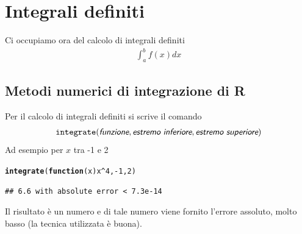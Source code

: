 \documentclass[onecolumn,11pt]{book}\usepackage[]{graphicx}\usepackage[]{color}
\makeatletter
\newcommand{\hlnum}[1]{\textcolor[rgb]{0.686,0.059,0.569}{#1}}%
\newcommand{\hlopt}[1]{\textcolor[rgb]{0,0,0}{#1}}%
\newcommand{\hlstd}[1]{\textcolor[rgb]{0.345,0.345,0.345}{#1}}%
\newcommand{\hlkwa}[1]{\textcolor[rgb]{0.161,0.373,0.58}{\textbf{#1}}}%
\newcommand{\hlkwc}[1]{\textcolor[rgb]{0.333,0.667,0.333}{#1}}%
\newcommand{\hlkwd}[1]{\textcolor[rgb]{0.737,0.353,0.396}{\textbf{#1}}}%
\newenvironment{kframe}{%
 \def\at@end@of@kframe{}%
 \ifinner\ifhmode%
  \def\at@end@of@kframe{\end{minipage}}%
  \begin{minipage}{\columnwidth}%
 \fi\fi%
 \def\FrameCommand##1{\hskip\@totalleftmargin \hskip-\fboxsep
 \colorbox{shadecolor}{##1}\hskip-\fboxsep
     \hskip-\linewidth \hskip-\@totalleftmargin \hskip\columnwidth}%
 \MakeFramed {\advance\hsize-\width
   \@totalleftmargin\z@ \linewidth\hsize
   \@setminipage}}%
 {\par\unskip\endMakeFramed%
 \at@end@of@kframe}
\newenvironment{knitrout}{}{} %
\newcommand{\varia}[1]{\textsl{\textsf{#1}}}
\makeatother
\begin{document}
\section{Integrali definiti}
Ci occupiamo ora del calcolo di integrali definiti
\begin{eqnarray*}
\int_a^b f(x)dx
\end{eqnarray*}

\subsection{Metodi numerici di integrazione di \textsf{R}}
Per il calcolo di integrali definiti si scrive il comando
\begin{eqnarray*}
\texttt{integrate}(\varia{funzione},
\varia{estremo inferiore}, \varia{estremo superiore})
\end{eqnarray*}
Ad esempio per $x$ tra -1 e 2
\begin{knitrout}
\color{fgcolor}\begin{kframe}
\begin{alltt}
\hlkwd{integrate}\hlstd{(}\hlkwa{function}\hlstd{(}\hlkwc{x}\hlstd{) x}\hlopt{^}\hlnum{4}\hlstd{,}\hlopt{-}\hlnum{1}\hlstd{,}\hlnum{2}\hlstd{)}
\end{alltt}
\begin{verbatim}
## 6.6 with absolute error < 7.3e-14
\end{verbatim}
\end{kframe}
\end{knitrout}
Il risultato \`e un numero e di tale numero viene fornito l'errore assoluto, molto basso (la tecnica utilizzata \`e buona).
\end{document}
